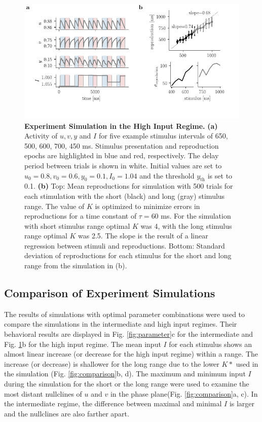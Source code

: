 \documentclass[10pt]{article}
\begin{document}
\begin{figure}[ht]
	\centering
	\includegraphics{figures/highI.pdf}
	\caption{\textbf{Experiment Simulation in the High Input Regime.} 
	\textbf{(a)} Activity of $u, v, y$ and $I$ for five example stimulus intervals of 650, 500, 600, 700, 450 ms. Stimulus presentation and reproduction epochs are highlighted in blue and red, respectively. The delay period between trials is shown in white. Initial values are set to $u_0=0.8 , v_0=0.6 , y_0=0.1, I_0=1.04$ and the threshold $y_{\text{th}}$ is set to 0.1. 
	\textbf{(b)} Top: Mean reproductions for simulation with 500 trials for each stimulation with the short (black) and long (gray) stimulus range. The value of $K$ is optimized to minimize errors in reproductions for a time constant of $\tau = 60$ ms. For the simulation with short stimulus range optimal $K$ was 4, with the long stimulus range optimal $K$ was 2.5.
		The slope is the result of a linear regression between stimuli and reproductions.
		Bottom: Standard deviation of reproductions for each stimulus for the short and long range from the simulation in (b).
	}
\label{highI}
\end{figure}

\subsection{Comparison of Experiment Simulations}
The results of simulations with optimal parameter combinations were used to compare the simulations in the intermediate and high input regimes.
Their behavioral results are displayed in Fig. \ref{fig:parameter}c for the intermediate and Fig. \ref{highI}b for the high input regime.
The mean input $I$ for each stimulus shows an almost linear increase (or decrease for the high input regime) within a range. The increase (or decrease) is shallower for the long range due to the lower $K*$ used in the simulation (Fig. \ref{fig:comparison}b, d).
The maximum and minimum input $I$ during the simulation for the short or the long range were used to examine the most distant nullclines of $u$ and $v$ in the phase plane(Fig. \ref{fig:comparison}a, c). 
In the intermediate regime, the difference between maximal and minimal $I$ is larger and the nullclines are also farther apart.
\end{document}
